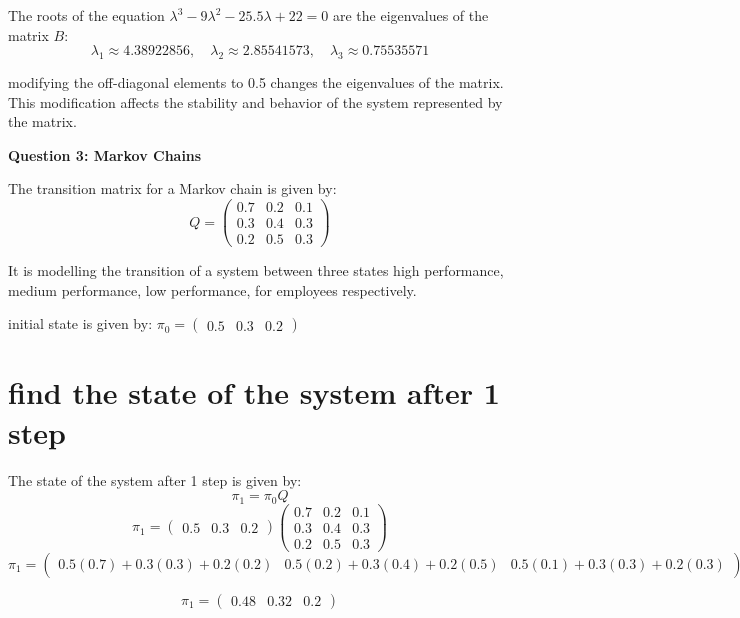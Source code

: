 \documentclass{article}
\begin{document}
The roots of the equation \(\lambda^3 - 9\lambda^2 -25.5\lambda + 22 = 0\) are the eigenvalues of the matrix \(B\):
\[\lambda_1 \approx 4.38922856, \quad \lambda_2 \approx 2.85541573, \quad \lambda_3 \approx 0.75535571\]

modifying the off-diagonal elements to 0.5 changes the eigenvalues of the matrix. This modification affects the stability and behavior of the system represented by the matrix.

\begin{center}
    \large \textbf{Question 3: Markov Chains}
\end{center}

The transition matrix for a Markov chain is given by:
\[Q=\begin{pmatrix}
0.7 & 0.2 & 0.1 \\
0.3 & 0.4 & 0.3 \\
0.2 & 0.5 & 0.3
\end{pmatrix}\]

It is modelling the transition of a system between three states high performance, medium performance, low performance, for employees respectively.


initial state is given by: \(\pi_0 = \begin{pmatrix} 0.5 & 0.3 & 0.2 \end{pmatrix}\)

\section{find the state of the system after 1 step}
The state of the system after 1 step is given by:
\[\pi_1 = \pi_0Q\]
\[\pi_1 = \begin{pmatrix} 0.5 & 0.3 & 0.2 \end{pmatrix}\begin{pmatrix}0.7 & 0.2 & 0.1 \\ 0.3 & 0.4 & 0.3 \\ 0.2 & 0.5 & 0.3\end{pmatrix}\]
\[\pi_1 = \begin{pmatrix}
0.5(0.7) + 0.3(0.3) + 0.2(0.2) & 0.5(0.2) + 0.3(0.4) + 0.2(0.5) & 0.5(0.1) + 0.3(0.3) + 0.2(0.3)
\end{pmatrix}\]

\[\pi_1 = \begin{pmatrix}0.48 & 0.32 & 0.2\end{pmatrix}\]
\end{document}
